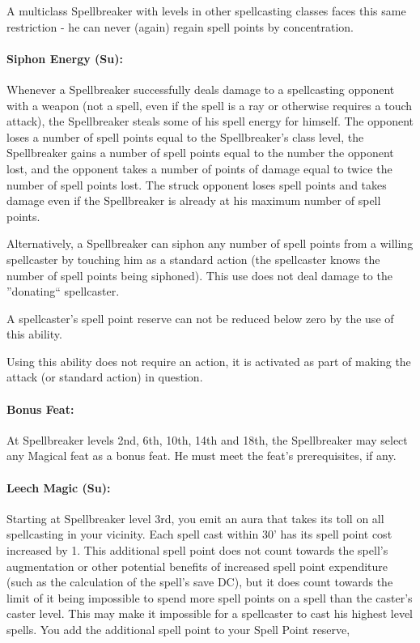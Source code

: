 A multiclass Spellbreaker with levels in other spellcasting classes faces this same restriction - he can never (again) regain spell points by concentration.
\paragraph{Siphon Energy (Su):} Whenever a Spellbreaker successfully deals damage to a spellcasting opponent with a weapon (not a spell, even if the spell is a ray or otherwise requires a touch attack), the Spellbreaker steals some of his spell energy for himself. The opponent loses a number of spell points equal to the Spellbreaker's class level, the Spellbreaker gains a number of spell points equal to the number the opponent lost, and the opponent takes a number of points of damage equal to twice the number of spell points lost. The struck opponent loses spell points and takes damage even if the Spellbreaker is already at his maximum number of spell points.

Alternatively, a Spellbreaker can siphon any number of spell points from a willing spellcaster by touching him as a standard action (the spellcaster knows the number of spell points being siphoned). This use does not deal damage to the ''donating`` spellcaster.

A spellcaster's spell point reserve can not be reduced below zero by the use of this ability.

Using this ability does not require an action, it is activated as part of making the attack (or standard action) in question.
\paragraph{Bonus Feat:} 
At Spellbreaker levels 2nd, 6th, 10th, 14th and 18th, the Spellbreaker may select any Magical feat as a bonus feat. He must meet the feat's prerequisites, if any.
\paragraph{Leech Magic (Su):} Starting at Spellbreaker level 3rd, you emit an aura that takes its toll on all spellcasting in your vicinity. Each spell cast within 30' has its spell point cost increased by 1. This additional spell point does not count towards the spell's augmentation or other potential benefits of increased spell point expenditure (such as the calculation of the spell's save DC), but it does count towards the limit of it being impossible to spend more spell points on a spell than the caster's caster level. This may make it impossible for a spellcaster to cast his highest level spells. You add the additional spell point to your Spell Point reserve, 

